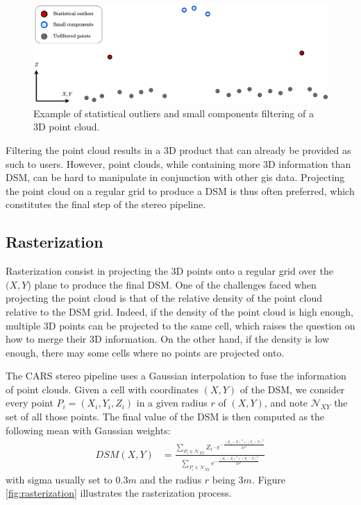 \begin{figure}
    \centering
    \includegraphics[width=\linewidth]{Images/Chap_1/Point_cloud_filtering.png}
    \caption{Example of statistical outliers and small components filtering of a 3D point cloud.}
    \label{fig:point_cloud_filtering}
\end{figure}

Filtering the point cloud results in a 3D product that can already be provided as such to users. However, point clouds, while containing more 3D information than DSM, can be hard to manipulate in conjunction with other \acrshort{gis} data. Projecting the point cloud on a regular grid to produce a DSM is thus often preferred, which constitutes the final step of the stereo pipeline.

\subsection{Rasterization}
Rasterization consist in projecting the 3D points onto a regular grid over the $(X,Y$) plane to produce the final DSM. One of the challenges faced when projecting the point cloud is that of the relative density of the point cloud relative to the DSM grid. Indeed, if the density of the point cloud is high enough, multiple 3D points can be projected to the same cell, which raises the question on how to merge their 3D information. On the other hand, if the density is low enough, there may some cells where no points are projected onto. 

The CARS stereo pipeline uses a Gaussian interpolation to fuse the information of point clouds. Given a cell with coordinates $(X,Y)$ of the DSM, we consider every point $P_i=(X_i, Y_i, Z_i)$ in a given radius $r$ of $(X,Y)$, and note $\mathcal{N}_{XY}$ the set of all those points. The final value of the DSM is then computed as the following mean with Gaussian weights:
\begin{align}
    DSM(X,Y) &= \frac{\sum_{P_i\in\mathcal{N}_{XY}}Z_i\cdot e^{-\frac{(X_i-X)^2+(Y_i-Y)^2}{2\sigma^2}}}{\sum_{P_i\in\mathcal{N}_{XY}} e^{-\frac{(X_i-X)^2+(Y_i-Y)^2}{2\sigma^2}}}
\end{align}
with sigma usually set to $0.3m$ and the radius $r$ being $3m$. Figure \ref{fig:rasterization} illustrates the rasterization process.

